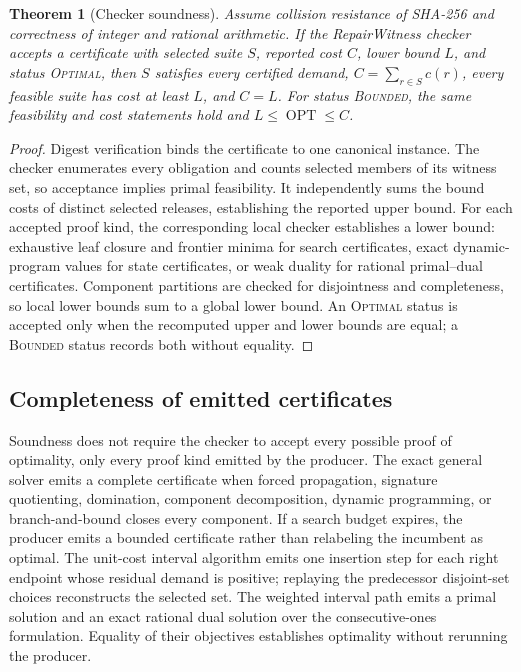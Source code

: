 \documentclass[10pt,conference]{IEEEtran}
\newtheorem{theorem}{Theorem}
\begin{document}
\begin{theorem}[Checker soundness]
Assume collision resistance of SHA-256 and correctness of integer and rational arithmetic. If the RepairWitness checker accepts a certificate with selected suite $S$, reported cost $C$, lower bound $L$, and status \textsc{Optimal}, then $S$ satisfies every certified demand, $C=\sum_{r\in S}c(r)$, every feasible suite has cost at least $L$, and $C=L$. For status \textsc{Bounded}, the same feasibility and cost statements hold and $L\leq \operatorname{OPT}\leq C$.
\end{theorem}
\begin{proof}
Digest verification binds the certificate to one canonical instance. The checker enumerates every obligation and counts selected members of its witness set, so acceptance implies primal feasibility. It independently sums the bound costs of distinct selected releases, establishing the reported upper bound. For each accepted proof kind, the corresponding local checker establishes a lower bound: exhaustive leaf closure and frontier minima for search certificates, exact dynamic-program values for state certificates, or weak duality for rational primal--dual certificates. Component partitions are checked for disjointness and completeness, so local lower bounds sum to a global lower bound. An \textsc{Optimal} status is accepted only when the recomputed upper and lower bounds are equal; a \textsc{Bounded} status records both without equality.\end{proof}

\subsection{Completeness of emitted certificates}
Soundness does not require the checker to accept every possible proof of optimality, only every proof kind emitted by the producer. The exact general solver emits a complete certificate when forced propagation, signature quotienting, domination, component decomposition, dynamic programming, or branch-and-bound closes every component. If a search budget expires, the producer emits a bounded certificate rather than relabeling the incumbent as optimal. The unit-cost interval algorithm emits one insertion step for each right endpoint whose residual demand is positive; replaying the predecessor disjoint-set choices reconstructs the selected set. The weighted interval path emits a primal solution and an exact rational dual solution over the consecutive-ones formulation. Equality of their objectives establishes optimality without rerunning the producer.
\end{document}
